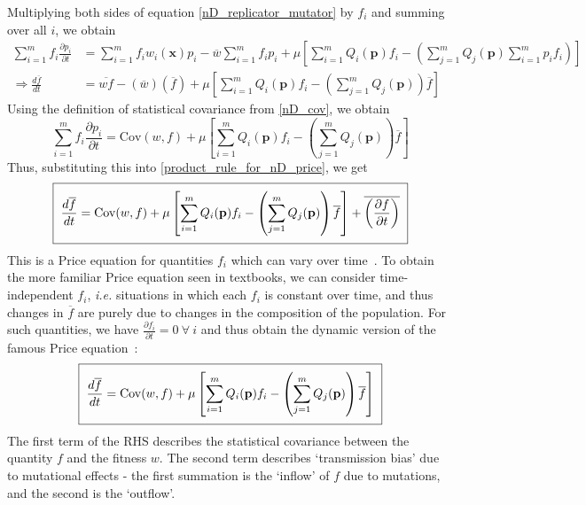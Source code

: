 Multiplying both sides of equation \eqref{nD_replicator_mutator} by $f_i$ and summing over all $i$, we obtain
\begin{align*}
\sum\limits_{i=1}^{m}f_i\frac{\partial p_i}{\partial t} &= \sum\limits_{i=1}^{m}f_iw_i(\mathbf{x})p_i - \overline{w}\sum\limits_{i=1}^{m}f_ip_i + \mu\left[\sum\limits_{i=1}^{m}Q_i(\mathbf{p})f_i - \left(\sum\limits_{j=1}^{m}Q_j(\mathbf{p})\sum\limits_{i=1}^{m}p_if_i\right)\right]\\
\Rightarrow \frac{d\overline{f}}{dt} &= \overline{wf}-(\overline{w})(\overline{f}) + \mu\left[\sum\limits_{i=1}^{m}Q_i(\mathbf{p})f_i - \left(\sum\limits_{j=1}^{m}Q_j(\mathbf{p})\right)\overline{f}\right]
\end{align*}
Using the definition of statistical covariance from \eqref{nD_cov}, we obtain
\begin{equation}
\sum\limits_{i=1}^{m}f_i\frac{\partial p_i}{\partial t} = \mathrm{Cov}(w,f) + \mu\left[\sum\limits_{i=1}^{m}Q_i(\mathbf{p})f_i - \left(\sum\limits_{j=1}^{m}Q_j(\mathbf{p})\right)\overline{f}\right] 
\end{equation}
Thus, substituting this into \eqref{product_rule_for_nD_price}, we get
\begin{equation}
\label{nD_Price_time_dependent}
\setlength{\fboxsep}{2\fboxsep}\boxed{\frac{d\overline{f}}{dt} = \mathrm{Cov}(w,f) + \mu\left[\sum\limits_{i=1}^{m}Q_i(\mathbf{p})f_i - \left(\sum\limits_{j=1}^{m}Q_j(\mathbf{p})\right)\overline{f}\right] + \overline{\left(\frac{\partial f}{\partial t}\right)}}
\end{equation}
This is a Price equation for quantities $f_i$ which can vary over time~\citep{lion_theoretical_2018,day_price_2020}. To obtain the more familiar Price equation seen in textbooks, we can consider time-independent $f_i$, \emph{i.e.} situations in which each $f_i$ is constant over time, and thus changes in $\overline{f}$ are purely due to changes in the composition of the population. For such quantities, we have $\frac{\partial f_i}{\partial t} = 0 \ \forall \ i$ and thus obtain the dynamic version of the famous Price equation~\citep{page_unifying_2002,lion_theoretical_2018}:
\begin{equation}
\label{nD_Price}
\setlength{\fboxsep}{2\fboxsep}\boxed{
	\frac{d\overline{f}}{dt} = \mathrm{Cov}(w,f) + \mu\left[\sum\limits_{i=1}^{m}Q_i(\mathbf{p})f_i - \left(\sum\limits_{j=1}^{m}Q_j(\mathbf{p})\right)\overline{f}\right]}
\end{equation}
The first term of the RHS describes the statistical covariance between the quantity $f$ and the fitness $w$. The second term describes `transmission bias' due to mutational effects - the first summation is the `inflow' of $f$ due to mutations, and the second is the `outflow'.

